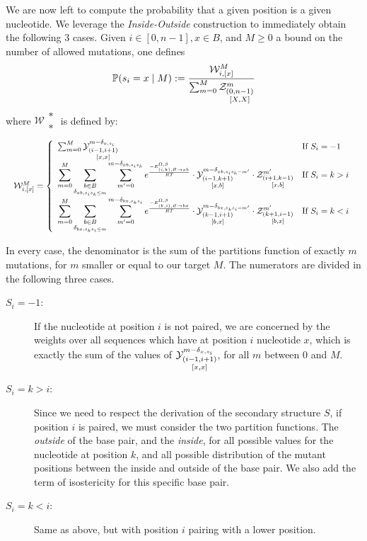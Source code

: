 We are now left to compute the probability that a given position is a given nucleotide.
We leverage the \emph{Inside-Outside} construction to immediately obtain the following $3$ cases.
Given $i\in[0,n-1],x\in B$, and $M\geq 0$ a bound on the number of allowed mutations, one defines
\begin{equation}
	\mathbb{P}(s_i = x\;|\; M) := \frac{\mathcal{W}^M_{\substack{i, [x]}}}{\sum_{m=0}^{M}\Z{0,n-1}{m}{X,X}}\label{eq:normalize}
\end{equation}
where $\mathcal{W}{\substack{\ast\\ \ast}}$ is defined by:
\begin{equation}
\resizebox{\textwidth}{!}{%
$ \mathcal{W}^M_{\substack{i, [x]}} =  \left\{
	\begin{array}{ll}
			\sum_{m=0}^{M}
			\Y{i-1,i+1}{m-\Kron_{x,s_i}}{x,x}
		&\text{If }S_i = -1\\
			\displaystyle
			\sum_{m=0}^{M}
			\sum_{\substack{b\in B\\\Kron_{xb,s_is_k\leq m}}}
			\sum_{m'=0}^{m-\Kron_{xb,s_is_k}}
     	 e^{\frac{-E_{(i,k),\varnothing\to xb}^{\Omega,\beta} }{RT}}
			\cdot\Y{i-1,k+1}{m-\Kron_{xb,s_is_k-m'}}{x,b}
			\cdot\Z{i+1,k-1}{m'}{x,b}
		&\text{If }S_i=k>i\\
    \displaystyle
			\sum_{m=0}^{M}
			\sum_{\substack{b\in B\\\Kron_{bx,s_ks_i\leq m}}}
			\sum_{m'=0}^{m-\Kron_{bx,s_ks_i}}
     	 e^{\frac{-E^{\Omega, \beta}_{(k,i),\varnothing\to bx}}{RT}}
			\cdot\Y{k-1,i+1}{m-\Kron_{bx,s_ks_i-m'}}{b,x}
			\cdot\Z{k+1,i-1}{m'}{b,x}
		&\text{If }S_i=k<i
	\end{array}\right.
$}\label{eq:combine}
\end{equation}

In every case, the denominator is the sum of the partitions function of exactly $m$ mutations, 
for $m$ smaller or equal to our target $M$. The numerators are divided in the following three cases.
\begin{description}
\item[$S_i=-1$:] If the nucleotide at position $i$ is not paired, we are concerned by the weights
over all sequences which have at position $i$ nucleotide $x$, which is exactly the sum
of the values of $\Y{i-1,i+1}{m-\Kron_{x,s_i}}{x,x}$, for all $m$ between $0$ and $M$.
\item[$S_i=k>i$:] Since we need to respect the derivation of the secondary structure $S$, if 
position $i$ is paired, we must consider the two partition functions. The \emph{outside} of the 
base pair, and the \emph{inside}, for all possible values for the nucleotide at position $k$, and
all possible distribution of the mutant positions between the inside and outside of the base pair. We also add the term of isostericity for this specific base pair.
\item[$S_i=k<i$:] Same as above, but with position $i$ pairing with a lower position.
\end{description}

